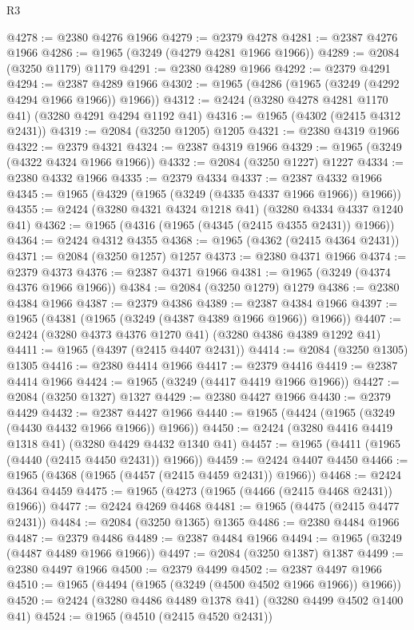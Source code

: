 \begin{lexlean}{R3}
\begin{coremodule}
@4278 := @2380 @4276 @1966
@4279 := @2379 @4278
@4281 := @2387 @4276 @1966
@4286 := @1965 (@3249 (@4279 @4281 @1966 @1966))
@4289 := @2084 (@3250 @1179) @1179
@4291 := @2380 @4289 @1966
@4292 := @2379 @4291
@4294 := @2387 @4289 @1966
@4302 := @1965 (@4286 (@1965 (@3249 (@4292 @4294 @1966 @1966)) @1966))
@4312 := @2424 (@3280 @4278 @4281 @1170 @41) (@3280 @4291 @4294 @1192 @41)
@4316 := @1965 (@4302 (@2415 @4312 @2431))
@4319 := @2084 (@3250 @1205) @1205
@4321 := @2380 @4319 @1966
@4322 := @2379 @4321
@4324 := @2387 @4319 @1966
@4329 := @1965 (@3249 (@4322 @4324 @1966 @1966))
@4332 := @2084 (@3250 @1227) @1227
@4334 := @2380 @4332 @1966
@4335 := @2379 @4334
@4337 := @2387 @4332 @1966
@4345 := @1965 (@4329 (@1965 (@3249 (@4335 @4337 @1966 @1966)) @1966))
@4355 := @2424 (@3280 @4321 @4324 @1218 @41) (@3280 @4334 @4337 @1240 @41)
@4362 := @1965 (@4316 (@1965 (@4345 (@2415 @4355 @2431)) @1966))
@4364 := @2424 @4312 @4355
@4368 := @1965 (@4362 (@2415 @4364 @2431))
@4371 := @2084 (@3250 @1257) @1257
@4373 := @2380 @4371 @1966
@4374 := @2379 @4373
@4376 := @2387 @4371 @1966
@4381 := @1965 (@3249 (@4374 @4376 @1966 @1966))
@4384 := @2084 (@3250 @1279) @1279
@4386 := @2380 @4384 @1966
@4387 := @2379 @4386
@4389 := @2387 @4384 @1966
@4397 := @1965 (@4381 (@1965 (@3249 (@4387 @4389 @1966 @1966)) @1966))
@4407 := @2424 (@3280 @4373 @4376 @1270 @41) (@3280 @4386 @4389 @1292 @41)
@4411 := @1965 (@4397 (@2415 @4407 @2431))
@4414 := @2084 (@3250 @1305) @1305
@4416 := @2380 @4414 @1966
@4417 := @2379 @4416
@4419 := @2387 @4414 @1966
@4424 := @1965 (@3249 (@4417 @4419 @1966 @1966))
@4427 := @2084 (@3250 @1327) @1327
@4429 := @2380 @4427 @1966
@4430 := @2379 @4429
@4432 := @2387 @4427 @1966
@4440 := @1965 (@4424 (@1965 (@3249 (@4430 @4432 @1966 @1966)) @1966))
@4450 := @2424 (@3280 @4416 @4419 @1318 @41) (@3280 @4429 @4432 @1340 @41)
@4457 := @1965 (@4411 (@1965 (@4440 (@2415 @4450 @2431)) @1966))
@4459 := @2424 @4407 @4450
@4466 := @1965 (@4368 (@1965 (@4457 (@2415 @4459 @2431)) @1966))
@4468 := @2424 @4364 @4459
@4475 := @1965 (@4273 (@1965 (@4466 (@2415 @4468 @2431)) @1966))
@4477 := @2424 @4269 @4468
@4481 := @1965 (@4475 (@2415 @4477 @2431))
@4484 := @2084 (@3250 @1365) @1365
@4486 := @2380 @4484 @1966
@4487 := @2379 @4486
@4489 := @2387 @4484 @1966
@4494 := @1965 (@3249 (@4487 @4489 @1966 @1966))
@4497 := @2084 (@3250 @1387) @1387
@4499 := @2380 @4497 @1966
@4500 := @2379 @4499
@4502 := @2387 @4497 @1966
@4510 := @1965 (@4494 (@1965 (@3249 (@4500 @4502 @1966 @1966)) @1966))
@4520 := @2424 (@3280 @4486 @4489 @1378 @41) (@3280 @4499 @4502 @1400 @41)
@4524 := @1965 (@4510 (@2415 @4520 @2431))

\end{coremodule}
\end{lexlean}
